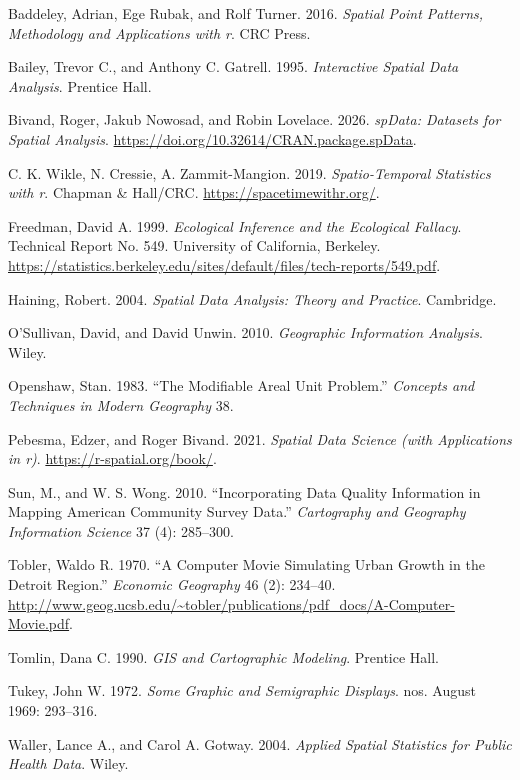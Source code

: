 \documentclass[
  letterpaper,
]{book}
\newlength{\cslhangindent}
\newenvironment{CSLReferences}[2] %
 {\begin{list}{}{%
  \setlength{\itemindent}{0pt}
  \setlength{\leftmargin}{0pt}
  \setlength{\parsep}{0pt}
  \ifodd #1
   \setlength{\leftmargin}{\cslhangindent}
   \setlength{\itemindent}{-1\cslhangindent}
  \fi
  \setlength{\itemsep}{#2\baselineskip}}}
 {\end{list}}
\begin{document}
\protect{}\label{refs}
\begin{CSLReferences}{1}{1}
Baddeley, Adrian, Ege Rubak, and Rolf Turner. 2016. \emph{Spatial Point
Patterns, Methodology and Applications with r}. CRC Press.

Bailey, Trevor C., and Anthony C. Gatrell. 1995. \emph{Interactive
Spatial Data Analysis}. Prentice Hall.

Bivand, Roger, Jakub Nowosad, and Robin Lovelace. 2026. \emph{spData:
Datasets for Spatial Analysis}.
\url{https://doi.org/10.32614/CRAN.package.spData}.

C. K. Wikle, N. Cressie, A. Zammit-Mangion. 2019. \emph{Spatio-Temporal
Statistics with r}. Chapman \& Hall/CRC.
\url{https://spacetimewithr.org/}.

Freedman, David A. 1999. \emph{Ecological Inference and the Ecological
Fallacy}. Technical Report No. 549. University of California, Berkeley.
\url{https://statistics.berkeley.edu/sites/default/files/tech-reports/549.pdf}.

Haining, Robert. 2004. \emph{Spatial Data Analysis: Theory and
Practice}. Cambridge.

O'Sullivan, David, and David Unwin. 2010. \emph{Geographic Information
Analysis}. Wiley.

Openshaw, Stan. 1983. {``The Modifiable Areal Unit Problem.''}
\emph{Concepts and Techniques in Modern Geography} 38.

Pebesma, Edzer, and Roger Bivand. 2021. \emph{Spatial Data Science (with
Applications in r)}. \url{https://r-spatial.org/book/}.

Sun, M., and W. S. Wong. 2010. {``{Incorporating Data Quality
Information in Mapping American Community Survey Data}.''}
\emph{Cartography and Geography Information Science} 37 (4): 285--300.

Tobler, Waldo R. 1970. {``{A Computer Movie Simulating Urban Growth in
the Detroit Region}.''} \emph{Economic Geography} 46 (2): 234--40.
\url{http://www.geog.ucsb.edu/~tobler/publications/pdf_docs/A-Computer-Movie.pdf}.

Tomlin, Dana C. 1990. \emph{GIS and Cartographic Modeling}. Prentice
Hall.

Tukey, John W. 1972. \emph{{Some Graphic and Semigraphic Displays}}.
nos. August 1969: 293--316.

Waller, Lance A., and Carol A. Gotway. 2004. \emph{Applied Spatial
Statistics for Public Health Data}. Wiley.

\end{CSLReferences}


\backmatter
\end{document}
